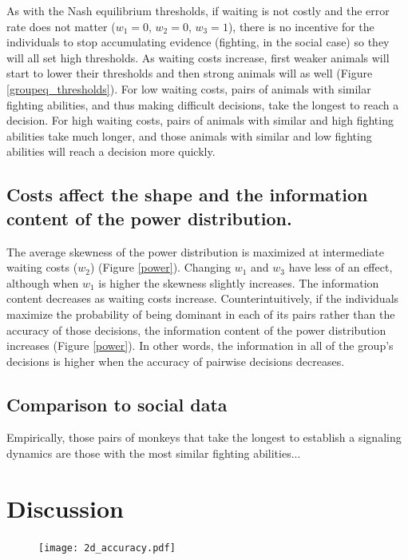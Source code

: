 \documentclass{article}
\begin{document}
As with the Nash equilibrium thresholds, if waiting is not costly and the error rate does not matter ($w_1=0$, $w_2=0$, $w_3=1$), there is no incentive for the individuals to stop accumulating evidence (fighting, in the social case) so they will all set high thresholds.  As waiting costs increase, first weaker animals will start to lower their thresholds and then strong animals will as well (Figure \ref{groupeq_thresholds}).  For low waiting costs, pairs of animals with similar fighting abilities, and thus making difficult decisions, take the longest to reach a decision.  For high waiting costs, pairs of animals with similar and high fighting abilities take much longer, and those animals with similar and low fighting abilities will reach a decision more quickly.

\subsection{Costs affect the shape and the information content of the power distribution.  }

The average skewness of the power distribution is maximized at intermediate waiting costs ($w_2$) (Figure \ref{power}). Changing $w_1$ and $w_3$ have less of an effect, although when $w_1$ is higher the skewness slightly increases. The information content decreases as waiting costs increase.  Counterintuitively, if the individuals maximize the probability of being dominant in each of its pairs rather than the accuracy of those decisions, the information content of the power distribution increases (Figure \ref{power}).  In other words, the information in all of the group's decisions is higher when the accuracy of pairwise decisions decreases.

\subsection{Comparison to social data }
Empirically, those pairs of monkeys that take the longest to establish a signaling dynamics are those with the most similar fighting abilities...

\section{Discussion}

\begin{figure}[ht]
\texttt{[image: 2d\_accuracy.pdf]}
\caption{\label{2dacc} }
\end{figure}
\end{document}
